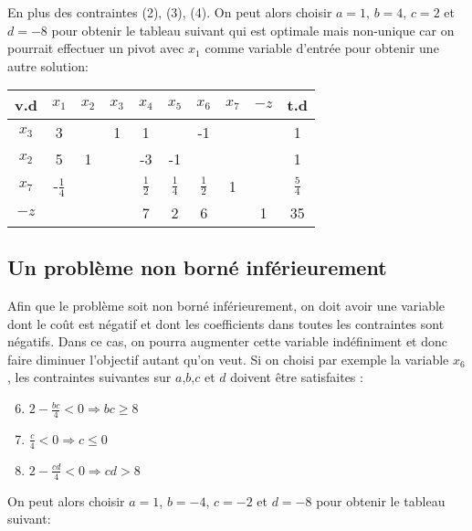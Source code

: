 En plus des contraintes (2), (3), (4). On peut alors choisir $a = 1$, $b=4$, $c=2$ et $d=-8$ pour obtenir le tableau suivant qui est optimale mais non-unique car on pourrait effectuer un pivot avec $x_1$ comme variable d’entrée pour obtenir une autre solution:
	
\begin{center}
	\renewcommand{\arraystretch}{1.5}
	\begin{tabular}{|c|cccccccc|c|}
		\hline
		 v.d  &     $x_1$      & $x_2$ & $x_3$ &     $x_4$     &     $x_5$     &     $x_6$     & $x_7$ & $-z$ &      t.d      \\ \hline
		$x_3$ &       3        &       &   1   &       1       &               &      -1       &       &      &       1       \\
		$x_2$ &       5        &   1   &       &      -3       &      -1       &               &       &      &       1       \\
		$x_7$ & -$\frac{1}{4}$ &       &       & $\frac{1}{2}$ & $\frac{1}{4}$ & $\frac{1}{2}$ &   1   &      & $\frac{5}{4}$ \\ \hline
		$-z$  &                &       &       &       7       &       2       &       6       &       &  1   &      35       \\ \hline
	\end{tabular}
\end{center}

\subsection{Un problème non borné inférieurement}
Afin que le problème soit non borné inférieurement, on doit avoir une variable dont le coût est négatif et dont les coefficients dans toutes les contraintes sont négatifs. Dans ce cas, on pourra augmenter cette variable indéfiniment et donc faire diminuer l’objectif autant qu’on veut. Si on choisi par exemple la variable $x_6$, les contraintes suivantes sur $a$,$b$,$c$ et $d$ doivent être satisfaites :
\begin{enumerate}[label=(\arabic*),itemsep=1pt]
	\setcounter{enumi}{5}
	\item $2 - \frac{bc}{4} < 0 \Rightarrow bc \geq 8$
	\item $\frac{c}{4} < 0 \Rightarrow  c \leq 0$
	\item $2 - \frac{cd}{4} < 0 \Rightarrow cd > 8$
\end{enumerate}

On peut alors choisir $a = 1$, $b = -4$, $c = -2$ et $d = -8$ pour obtenir le tableau suivant:
	
